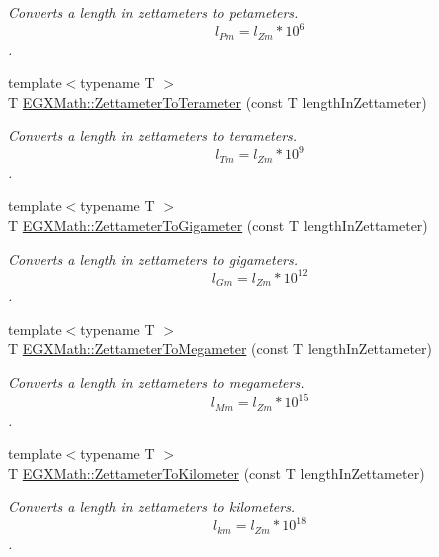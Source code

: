 \begin{DoxyCompactItemize}
\begin{DoxyCompactList}\small\item\em Converts a length in zettameters to petameters. \[ l_{Pm}=l_{Zm} * 10^{6} \]. \end{DoxyCompactList}\item 
{\footnotesize template$<$typename T $>$ }\\T \mbox{\hyperlink{group___e_g_x_math-_conversions-_length_conversions-_zettameter-_s_i_ga16dfe32824b09a16e5af4a6f663c0f38}{E\+G\+X\+Math\+::\+Zettameter\+To\+Terameter}} (const T length\+In\+Zettameter)
\begin{DoxyCompactList}\small\item\em Converts a length in zettameters to terameters. \[ l_{Tm}=l_{Zm} * 10^{9} \]. \end{DoxyCompactList}\item 
{\footnotesize template$<$typename T $>$ }\\T \mbox{\hyperlink{group___e_g_x_math-_conversions-_length_conversions-_zettameter-_s_i_gab6673b4fa72a1c196d7fba1260e7f78a}{E\+G\+X\+Math\+::\+Zettameter\+To\+Gigameter}} (const T length\+In\+Zettameter)
\begin{DoxyCompactList}\small\item\em Converts a length in zettameters to gigameters. \[ l_{Gm}=l_{Zm} * 10^{12} \]. \end{DoxyCompactList}\item 
{\footnotesize template$<$typename T $>$ }\\T \mbox{\hyperlink{group___e_g_x_math-_conversions-_length_conversions-_zettameter-_s_i_gaf29478b073f568afbf9c70b3c2eb94e4}{E\+G\+X\+Math\+::\+Zettameter\+To\+Megameter}} (const T length\+In\+Zettameter)
\begin{DoxyCompactList}\small\item\em Converts a length in zettameters to megameters. \[ l_{Mm}=l_{Zm} * 10^{15} \]. \end{DoxyCompactList}\item 
{\footnotesize template$<$typename T $>$ }\\T \mbox{\hyperlink{group___e_g_x_math-_conversions-_length_conversions-_zettameter-_s_i_ga99d03473393cdeeeca462cdd0928c9d9}{E\+G\+X\+Math\+::\+Zettameter\+To\+Kilometer}} (const T length\+In\+Zettameter)
\begin{DoxyCompactList}\small\item\em Converts a length in zettameters to kilometers. \[ l_{km}=l_{Zm} * 10^{18} \]. \end{DoxyCompactList}\item 

\end{DoxyCompactItemize}
